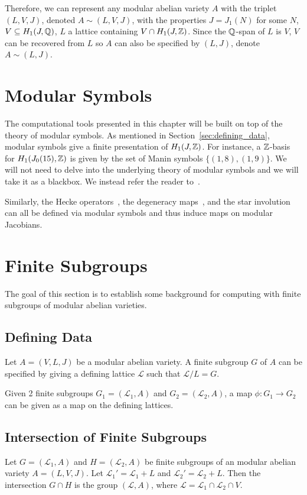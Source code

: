 Therefore, we can represent any modular abelian variety $A$ with the triplet
$(L, V, J)$, denoted $A\sim (L, V, J)$, with the properties $J=J_1(N)$
for some $N$, $V\subseteq H_1(J, \mathbb{Q})$, $L$ a lattice containing $V\cap H_1(J,
\mathbb{Z})$. Since the $\mathbb{Q}$-span of $L$ is $V$, $V$ can be recovered from $L$ so $A$
can also be specified by $(L, J)$, denote $A\sim (L, J)$.

\section{Modular Symbols}
\label{sec:modular_symbols}

The computational tools presented in this chapter will be built on top of the
theory of modular symbols. As mentioned in Section~\ref{sec:defining_data},
modular symbols give a finite presentation of $H_1(J, \mathbb{Z})$. For instance, a
$\mathbb{Z}$-basis for $H_1(J_0(15), \mathbb{Z})$ is given by the set of Manin symbols
$\{(1,8), (1,9)\}$. We will not need to delve into the underlying theory of
modular symbols and we will take it as a blackbox. We instead refer the reader
to~\cite[\S 3]{stein:modform}.

Similarly, the Hecke operators~\cite[\S 8.3]{stein:modform}, the degeneracy
maps~\cite[\S 8.6]{stein:modform}, and the star involution~\cite[\S
8.5]{stein:modform} can all be defined via modular symbols and thus induce maps
on modular Jacobians.

\section{Finite Subgroups}

The goal of this section is to establish some background for computing with
finite subgroups of modular abelian varieties.

\subsection{Defining Data}

Let $A=(V, L, J)$ be a modular abelian variety. A finite subgroup $G$ of $A$
can be specified by giving a defining lattice $\mathcal{L}$ such that
$\mathcal{L}/L = G$.

Given 2 finite subgroups $G_1=(\mathcal{L}_1, A)$ and $G_2=(\mathcal{L}_2, A)$,
a map $\phi: G_1\to G_2$ can be given as a map on the defining lattices.

\subsection{Intersection of Finite Subgroups}
\label{sec:finitegroup_intersection}
Let $G=(\mathcal{L}_1, A)$ and $H=(\mathcal{L}_2, A)$ be finite subgroups of an
modular abelian variety $A=(L, V, J)$. Let $\mathcal{L}_1 ' = \mathcal{L}_1+L$
and $\mathcal{L}_2 ' = \mathcal{L}_2 + L$. Then the intersection $G\cap H$ is
the group $(\mathcal{L}, A)$, where $\mathcal{L}=\mathcal{L}_1\cap
\mathcal{L}_2 \cap V$.

